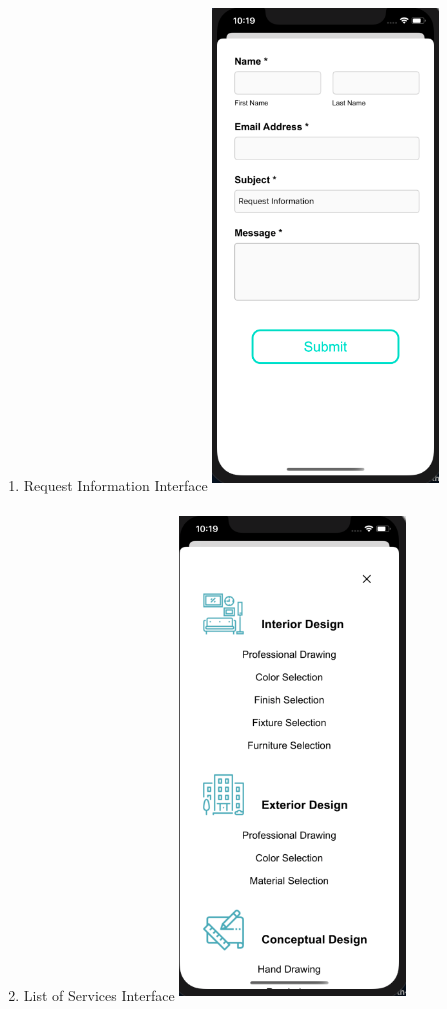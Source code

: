 \documentclass[onecolumn, draftclsnofoot,10pt, compsoc]{IEEEtran}
\begin{document}
\begin{enumerate}
  \newpage
       \item Request Information Interface\newline\newline
  \includegraphics[width=6cm, height=13cm]{ios-request-information.png}\newline
  \newpage
  \item List of Services Interface\newline\newline
  \includegraphics[width=6cm, height=13cm]{ios-list-of-services.png}\newline
  \newpage

\end{enumerate}
\end{document}
